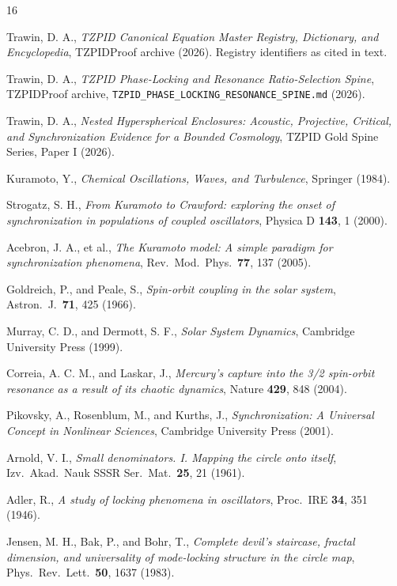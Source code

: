 \documentclass[11pt]{article}
\theoremstyle{remark}
\begin{document}
\begin{thebibliography}{16}

 Trawin, D. A., \emph{TZPID Canonical Equation Master Registry, Dictionary, and Encyclopedia}, TZPIDProof archive (2026). Registry identifiers as cited in text.

 Trawin, D. A., \emph{TZPID Phase-Locking and Resonance Ratio-Selection Spine}, TZPIDProof archive, \texttt{TZPID\_PHASE\_LOCKING\_RESONANCE\_SPINE.md} (2026).

 Trawin, D. A., \emph{Nested Hyperspherical Enclosures: Acoustic, Projective, Critical, and Synchronization Evidence for a Bounded Cosmology}, TZPID Gold Spine Series, Paper I (2026).

 Kuramoto, Y., \emph{Chemical Oscillations, Waves, and Turbulence}, Springer (1984).

 Strogatz, S. H., \emph{From Kuramoto to Crawford: exploring the onset of synchronization in populations of coupled oscillators}, Physica D \textbf{143}, 1 (2000).

 Acebron, J. A., et al., \emph{The Kuramoto model: A simple paradigm for synchronization phenomena}, Rev.\ Mod.\ Phys.\ \textbf{77}, 137 (2005).

 Goldreich, P., and Peale, S., \emph{Spin-orbit coupling in the solar system}, Astron.\ J.\ \textbf{71}, 425 (1966).

 Murray, C. D., and Dermott, S. F., \emph{Solar System Dynamics}, Cambridge University Press (1999).

 Correia, A. C. M., and Laskar, J., \emph{Mercury's capture into the 3/2 spin-orbit resonance as a result of its chaotic dynamics}, Nature \textbf{429}, 848 (2004).

 Pikovsky, A., Rosenblum, M., and Kurths, J., \emph{Synchronization: A Universal Concept in Nonlinear Sciences}, Cambridge University Press (2001).

 Arnold, V. I., \emph{Small denominators. I. Mapping the circle onto itself}, Izv.\ Akad.\ Nauk SSSR Ser.\ Mat.\ \textbf{25}, 21 (1961).

 Adler, R., \emph{A study of locking phenomena in oscillators}, Proc.\ IRE \textbf{34}, 351 (1946).

 Jensen, M. H., Bak, P., and Bohr, T., \emph{Complete devil's staircase, fractal dimension, and universality of mode-locking structure in the circle map}, Phys.\ Rev.\ Lett.\ \textbf{50}, 1637 (1983).

\end{thebibliography}
\end{document}
